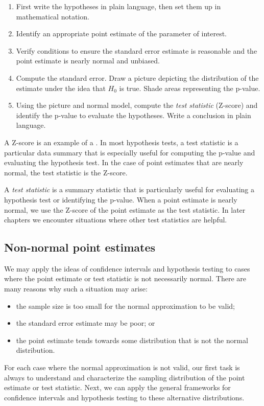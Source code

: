 \begin{termBox}{
	\begin{enumerate}
		\setlength{\itemsep}{0mm}
		\item First write the hypotheses in plain language, then set them up in mathematical notation.
		\item Identify an appropriate point estimate of the parameter of interest.
		\item Verify conditions to ensure the standard error estimate is reasonable and the point estimate is nearly normal and unbiased.
		\item Compute the standard error. Draw a picture depicting the distribution of the estimate under the idea that $H_0$ is true. Shade areas representing the p-value.
		\item Using the picture and normal model, compute the \emph{test statistic} (Z-score) and identify the p-value to evaluate the hypotheses. Write a conclusion in plain language.
	\end{enumerate}}
\end{termBox}


A Z-score is an example of a . In most hypothesis tests, a test statistic is a particular data summary that is especially useful for computing the p-value and evaluating the hypothesis test. In the case of point estimates that are nearly normal, the test statistic is the Z-score.

\begin{termBox}{
A \emph{test statistic} is a summary statistic that is particularly useful for evaluating a hypothesis test or identifying the p-value. When a point estimate is nearly normal, we use the Z-score of the point estimate as the test statistic. In later chapters we encounter situations where other test statistics are helpful.}
\end{termBox}


\subsection{Non-normal point estimates}

	We may apply the ideas of confidence intervals and hypothesis testing to cases where the point estimate or test statistic is not necessarily normal.
	There are many reasons why such a situation may arise:
	\begin{itemize}
		\setlength{\itemsep}{0mm}
		\item the sample size is too small for the normal approximation to be valid;
		\item the standard error estimate may be poor; or
		\item the point estimate tends towards some distribution that is not the normal distribution.
	\end{itemize}
	For each case where the normal approximation is not valid, our first task is always to understand and characterize the sampling distribution of the point estimate or test statistic. Next, we can apply the general frameworks for confidence intervals and hypothesis testing to these alternative distributions.


